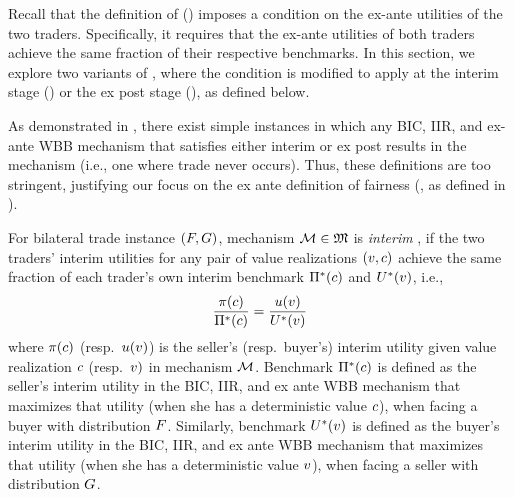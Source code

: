 Recall that the definition of {\ksfairness} () imposes a condition on the ex-ante utilities of the two traders. Specifically, it requires that the ex-ante utilities of both traders achieve the same fraction of their respective benchmarks. In this section, we explore two variants of {\ksfairness}, where the condition is modified to apply at the interim stage () or the ex post stage (), as defined below.

As demonstrated in , there exist simple instances in which any BIC, IIR, and ex-ante WBB mechanism that satisfies either interim {\ksfairness} or ex post {\ksfairness} results in the {\NoTrade} mechanism (i.e., one where trade never occurs). 
Thus, these definitions are too stringent, justifying our focus on the ex ante definition of fairness ({\ksfairness}, as defined in ).


\begin{definition}
\label{def:interim ks fairness}
    For bilateral trade instance $(F,G)$, mechanism $\mathcal{M}\in \mathfrak{M}$ is \emph{interim {\ksfair}}, if the two traders' interim utilities for any pair of value realizations $(v, c)$ achieve the same {fraction of} each trader's own interim benchmark $\Pi^*(c)$ and $U^*(v)$, i.e.,
    \begin{align*}
        \frac{\pi(c)}{\Pi^*(c)}
        = \frac{u(v)}{U^*(v)}
    \end{align*}
    where $\pi(c)$ (resp.\ $u(v)$) is the seller's (resp.\ buyer's) interim utility given value realization $c$ (resp.\ $v)$ in mechanism $\mathcal{M}$. Benchmark $\Pi^*(c)$ is defined as the seller's interim utility in the BIC, IIR, and ex ante WBB mechanism that maximizes that utility (when she has a deterministic value $c$), when facing a buyer with distribution $F$. Similarly, benchmark $U^*(v)$ is defined as the buyer's interim utility in the BIC, IIR, and ex ante WBB mechanism that maximizes that utility (when she has a deterministic value $v$), when facing a seller with distribution $G$.
\end{definition}

